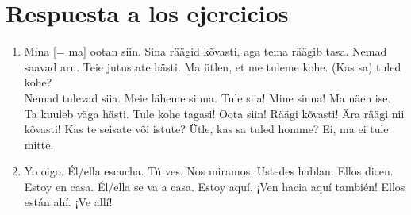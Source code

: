 \section*{\Large{Respuesta a los ejercicios}}

\begin{enumerate}
	\item Mina [= ma] ootan siin. Sina räägid kõvasti, aga tema räägib tasa. Nemad saavad aru. Teie jutustate hästi. Ma ütlen, et me tuleme kohe. (Kas sa) tuled kohe?\\

	Nemad tulevad siia. Meie läheme sinna. Tule siia! Mine sinna! Ma näen ise. Ta kuuleb väga hästi. Tule kohe tagasi! Oota siin! Räägi 	kõvasti! Ära räägi nii kõvasti! Kas te seisate või istute? Ütle, kas sa tuled homme? Ei, ma ei tule mitte.

	\item  Yo oigo. Él/ella escucha. Tú ves. Nos miramos. Ustedes hablan. Ellos dicen. Estoy en casa. Él/ella se va a casa. Estoy aquí. ¡Ven hacia aquí también! Ellos están ahí. ¡Ve allí!
\end{enumerate}
